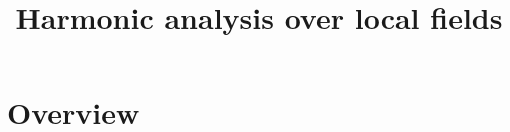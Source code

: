 

%


\title{Harmonic analysis over local fields}


\maketitle

\label{section-phantom}


\tableofcontents


\section{Overview}
\label{section-overview}









